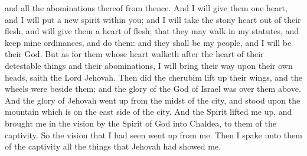 and all the abominations thereof from thence. And I will give them one heart, and I will put a new spirit within you; and I will take the stony heart out of their flesh, and will give them a heart of flesh; that they may walk in my statutes, and keep mine ordinances, and do them: and they shall be my people, and I will be their God. But as for them whose heart walketh after the heart of their detestable things and their abominations, I will bring their way upon their own heads, saith the Lord Jehovah.  Then did the cherubim lift up their wings, and the wheels were beside them; and the glory of the God of Israel was over them above. And the glory of Jehovah went up from the midst of the city, and stood upon the mountain which is on the east side of the city. And the Spirit lifted me up, and brought me in the vision by the Spirit of God into Chaldea, to them of the captivity. So the vision that I had seen went up from me. Then I spake unto them of the captivity all the things that Jehovah had showed me. 

